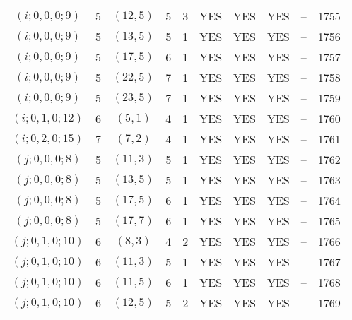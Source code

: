 \begin{longtable}{|c|c|c|c|c|c|c|c|c|c|}
$(i; 0, 0, 0; 9)$ & 5 & $(12, 5)$ & 5 & 3 & YES & YES & YES & -- & 1755\\
$(i; 0, 0, 0; 9)$ & 5 & $(13, 5)$ & 5 & 1 & YES & YES & YES & -- & 1756\\
$(i; 0, 0, 0; 9)$ & 5 & $(17, 5)$ & 6 & 1 & YES & YES & YES & -- & 1757\\
$(i; 0, 0, 0; 9)$ & 5 & $(22, 5)$ & 7 & 1 & YES & YES & YES & -- & 1758\\
$(i; 0, 0, 0; 9)$ & 5 & $(23, 5)$ & 7 & 1 & YES & YES & YES & -- & 1759\\
$(i; 0, 1, 0; 12)$ & 6 & $(5, 1)$ & 4 & 1 & YES & YES & YES & -- & 1760\\
$(i; 0, 2, 0; 15)$ & 7 & $(7, 2)$ & 4 & 1 & YES & YES & YES & -- & 1761\\
$(j; 0, 0, 0; 8)$ & 5 & $(11, 3)$ & 5 & 1 & YES & YES & YES & -- & 1762\\
$(j; 0, 0, 0; 8)$ & 5 & $(13, 5)$ & 5 & 1 & YES & YES & YES & -- & 1763\\
$(j; 0, 0, 0; 8)$ & 5 & $(17, 5)$ & 6 & 1 & YES & YES & YES & -- & 1764\\
$(j; 0, 0, 0; 8)$ & 5 & $(17, 7)$ & 6 & 1 & YES & YES & YES & -- & 1765\\
$(j; 0, 1, 0; 10)$ & 6 & $(8, 3)$ & 4 & 2 & YES & YES & YES & -- & 1766\\
$(j; 0, 1, 0; 10)$ & 6 & $(11, 3)$ & 5 & 1 & YES & YES & YES & -- & 1767\\
$(j; 0, 1, 0; 10)$ & 6 & $(11, 5)$ & 6 & 1 & YES & YES & YES & -- & 1768\\
$(j; 0, 1, 0; 10)$ & 6 & $(12, 5)$ & 5 & 2 & YES & YES & YES & -- & 1769
\end{longtable}
